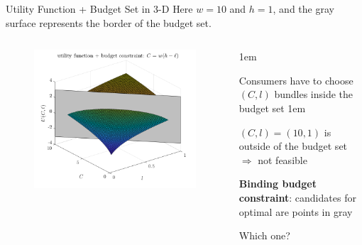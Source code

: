 \documentclass[11pt,aspectratio=43]{beamer}
\let\olditemize=\itemize
\let\endolditemize=\enditemize
\renewenvironment{itemize}{\olditemize \itemsep1em}{\endolditemize}
\theoremstyle{definition}
\begin{document}
\begin{frame}{Utility Function + Budget Set in 3-D}
\label{slide:Utility_Function___Budget_Set_in_3_D}
    Here $ w = 10 $ and $ h = 1 $, and the gray surface represents the \alert{border} of the budget set.
    \begin{columns}
        \begin{column}{0.6\textwidth}
            \begin{figure}
                \includegraphics[width=\textwidth]{./figures/UtilityBudget.png}
            \end{figure}
        \end{column}
        \begin{column}{0.4\textwidth}
            \begin{itemize}
                \item Consumers have to choose $ ( C, l ) $ bundles \alert{inside the budget set}
                \begin{itemize}
                    \item $ ( C, l ) = ( 10, 1 ) $ is \alert{outside} of the budget set $ \Rightarrow  $ not feasible
                \end{itemize}
                \item \textbf{Binding budget constraint}: candidates for optimal are points in gray
                \item Which one?
            \end{itemize}
        \end{column}
    \end{columns}
\end{frame}
\end{document}
